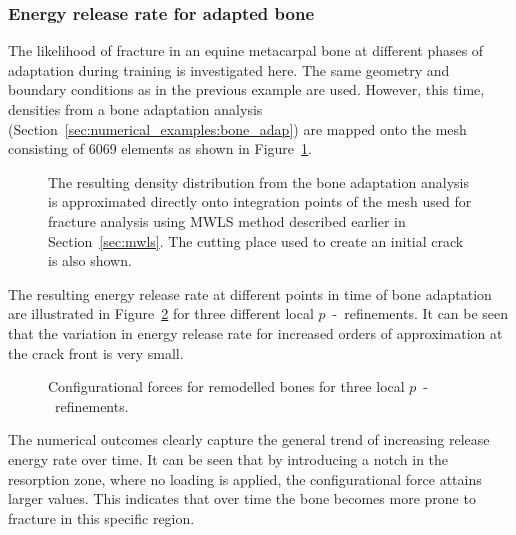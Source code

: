 \documentclass[review]{elsarticle}
\numberwithin{equation}{section}
\begin{document}
\subsubsection{Energy release rate for adapted bone}
The likelihood of fracture in an equine metacarpal bone at different phases of adaptation during training is investigated here.
The same geometry and boundary conditions as in the previous example are used. 
However, this time, densities from a bone adaptation analysis (Section~\ref{sec:numerical_examples:bone_adap}) are mapped onto the mesh consisting of 6069 elements as shown in Figure~\ref{fig:frackmeshcutting}. 
\begin{figure}
	\centering
			\def\svgwidth{12cm}
		
	\caption{The resulting density distribution from the bone adaptation analysis is approximated directly onto integration points of the mesh used for fracture analysis using MWLS method described earlier in Section~\ref{sec:mwls}. The cutting place used to create an initial crack is also shown.}
	\label{fig:frackmeshcutting}
\end{figure}
The resulting energy release rate at different points in time of bone adaptation are illustrated in Figure~\ref{fig:crackmc3release} for three different local $p$~-~refinements. It can be seen that the variation in energy release rate for increased orders of approximation at the crack front is very small. 
\begin{figure}
	\centering
	\caption{Configurational forces for remodelled bones for three local $p$~-~refinements.}
	\label{fig:crackmc3release}
\end{figure}
The numerical outcomes clearly capture the general trend of increasing release energy rate over time. It can be seen that by introducing a notch in the resorption zone, where no loading is applied, the configurational force attains larger values. This indicates that over time the bone becomes more prone to fracture in this specific region. 
\end{document}

